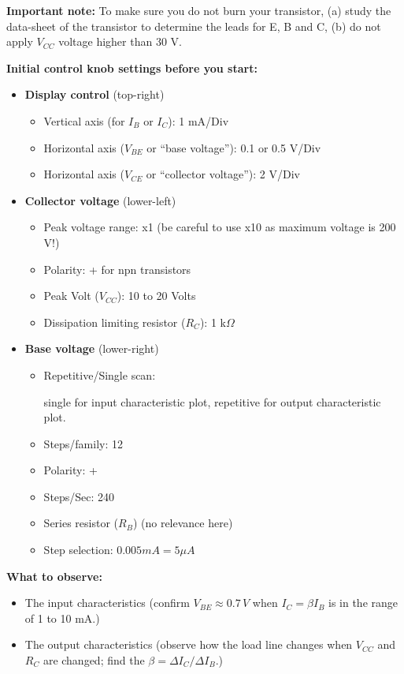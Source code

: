 {\bf Important note:} To make sure you do not burn your transistor, 
(a) study the data-sheet of the transistor to determine the leads for E, B and C,
(b) do not apply $V_{CC}$ voltage higher than 30 V.


{\bf Initial control knob settings before you start:}
\begin{itemize}
\item {\bf Display control} (top-right)
  \begin{itemize}
  \item Vertical axis (for $I_B$ or $I_C$): 1 mA/Div
  \item Horizontal axis ($V_{BE}$ or ``base voltage''): 0.1 or 0.5 V/Div
  \item Horizontal axis ($V_{CE}$ or ``collector voltage''): 2 V/Div
  \end{itemize}
\item {\bf Collector voltage} (lower-left)
  \begin{itemize}
  \item Peak voltage range: x1 (be careful to use x10 as maximum voltage is 200 V!)
  \item Polarity: + for npn transistors
  \item Peak Volt ($V_{CC}$): 10 to 20 Volts
  \item Dissipation limiting resistor ($R_C$): 1 k$\Omega$
  \end{itemize}
\item {\bf Base voltage} (lower-right)
  \begin{itemize}
  \item Repetitive/Single scan: 

    single for input characteristic plot, repetitive for output characteristic plot.
  \item Steps/family: 12
  \item Polarity: +
  \item Steps/Sec: 240
  \item Series resistor ($R_B$) (no relevance here)
  \item Step selection: $0.005 mA = 5 \mu A$
  \end{itemize}
\end{itemize}

{\bf What to observe:}

\begin{itemize}
\item The input characteristics (confirm $V_{BE}\approx 0.7\,V$ when
  $I_C=\beta I_B$ is in the range of 1 to 10 mA.)
\item The output characteristics 
  (observe how the load line changes when $V_{CC}$ and $R_C$ are 
  changed; find the $\beta=\Delta I_C/\Delta I_B$.)
\end{itemize}


